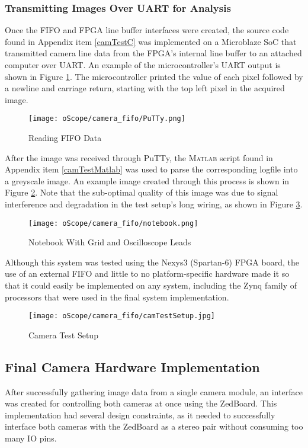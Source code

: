 \subsubsection{Transmitting Images Over UART for Analysis} \label{UARTimg}
Once the FIFO and FPGA line buffer interfaces were created, the source code found in Appendix item \ref{camTestC} was implemented on a Microblaze SoC that transmitted camera line data from the FPGA's internal line buffer to an attached computer over UART. An example of the microcontroller's UART output is shown in Figure \ref{PuTTYfifoData}. The microcontroller printed the value of each pixel followed by a newline and carriage return, starting with the top left pixel in the acquired image. 
\begin{figure}[H]
	\centerline{\texttt{[image: oScope/camera\_fifo/PuTTy.png]}}
	\caption{Reading FIFO Data}
	\label{PuTTYfifoData}
\end{figure}
\par
After the image was received through PuTTy, the \textsc{Matlab} script found in Appendix item \ref{camTestMatlab} was used to parse the corresponding logfile into a greyscale image. An example image created through this process is shown in Figure \ref{notebookImage}. Note that the sub-optimal quality of this image was due to signal interference and degradation in the test setup's long wiring, as shown in Figure \ref{camTestSetup}. 
\begin{figure}[H]
	\centerline{\texttt{[image: oScope/camera\_fifo/notebook.png]}}
	\caption{Notebook With Grid and Oscilloscope Leads}
	\label{notebookImage}
\end{figure}
\par
Although this system was tested using the Nexys3 (Spartan-6) FPGA board, the use of an external FIFO and little to no platform-specific hardware made it so that it could easily be implemented on any system, including the Zynq family of processors that were used in the final system implementation.   
\begin{figure}[H]
	\centerline{\texttt{[image: oScope/camera\_fifo/camTestSetup.jpg]}}
	\caption{Camera Test Setup}
	\label{camTestSetup}
\end{figure}

\subsection{Final Camera Hardware Implementation}
After successfully gathering image data from a single camera module, an interface was created for controlling both cameras at once using the ZedBoard. This implementation had several design constraints, as it needed to successfully interface both cameras with the ZedBoard as a stereo pair without consuming too many IO pins. 
